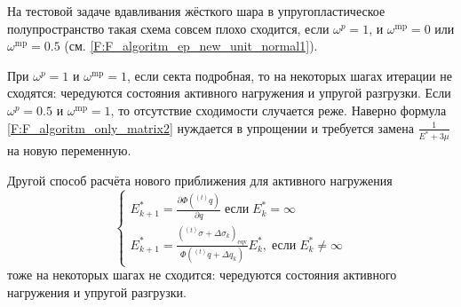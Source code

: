 На тестовой задаче вдавливания жёсткого шара в упругопластическое полупространство такая схема совсем плохо сходится, если $\omega^p=1$, и $\omega^{\mathrm{mp}} = 0$ или $\omega^{\mathrm{mp}} = 0.5$ (см. \eqref{F:F_algoritm_ep_new_unit_normal1}).

При $\omega^p=1$ и $\omega^{\mathrm{mp}} = 1$, если секта подробная, то на некоторых шагах итерации не сходятся: чередуются состояния активного нагружения и упругой разгрузки. Если $\omega^p=0.5$ и $\omega^{\mathrm{mp}} = 1$, то отсутствие сходимости случается реже. Наверно формула \eqref{F:F_algoritm_only_matrix2} нуждается в упрощении и требуется замена $\frac{1}{E^*+3\mu}$ на новую переменную.

Другой способ расчёта нового приближения для активного нагружения
\begin{equation}
\begin{cases}
E_{k+1}^*=\frac{\partial\Phi\left({}^{(t)}q\right)}{\partial q}\;\mbox{если}\;E_{k}^*=\infty\\
E_{k+1}^*=\frac{\left({}^{(t)}\sigma + \Delta\sigma_{k}\right)_{\mathrm{eqv}} }{\Phi\left({}^{(t)}q+\Delta q_k\right)}E_{k}^*,\;\mbox{если}\;E_{k}^*\neq\infty
\end{cases}
\label{F:F_algoritm_only_matrix3}
\end{equation}
тоже на некоторых шагах не сходится: чередуются состояния активного нагружения и упругой разгрузки.

